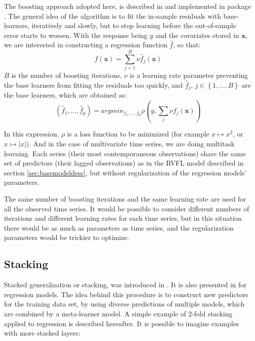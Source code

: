 The boosting approach adopted here, is described in \cite{hothorn2010model} and implemented in  package . The general idea of the algorithm is to fit the in-sample residuals with base-learners, iteratively and slowly, but to stop learning before the out-of-sample error starts to worsen. With the response being $y$ and the covariates stored in  $\textbf{x}$, we are interested in constructing a regression function $\hat{f}$, so that:
$$
\hat{f}(\textbf{x}) = \sum_{j=1}^B \nu \hat{f}_j(\textbf{x})
$$
$B$ is the number of boosting iterations, $\nu$ is a learning rate parameter preventing the base learners from fitting the residuals too quickly, and  $\hat{f}_j$, $j \in \left \lbrace 1, \ldots, B \right \rbrace$ are the base learners, which are obtained as:
$$
\left(\hat{f}_1, \ldots,  \hat{f}_p\right) = argmin_{f_1, \ldots, f_p}  \rho \left( y, \sum_j \nu f_j\left( \textbf{x} \right) \right)
$$

In this expression, $\rho$ is a loss function to be minimized (for example $x \mapsto x^2$, or $x \mapsto |x|$). And in the case of multivariate time series, we are doing multitask learning. Each series (their most contemporaneous observations) share the same set of predictors (their lagged observations) as in the RVFL model described in section \ref{sec:basemodeldesc}, but without regularization of the regression models' parameters.

The same number of boosting iterations and the same learning rate are used for all the observed time series. It would be possible to consider different numbers of iterations and different learning rates for each time series, but in this situation there would be as much as parameters as time series, and the regularization parameters would be trickier to optimize.

\subsection{Stacking}
\label{sec:rvflstacking}

Stacked generalization or stacking, was introduced in \cite{wolpert1992stacked}. It is also presented in \cite{breiman1996stacked} for regression models. The idea behind this procedure is to construct new predictors for the training data set, by using diverse predictions of multiple models, which are combined by a meta-learner model. A simple example of 2-fold stacking applied to regression is described hereafter. It is possible to imagine examples with more stacked layers:

